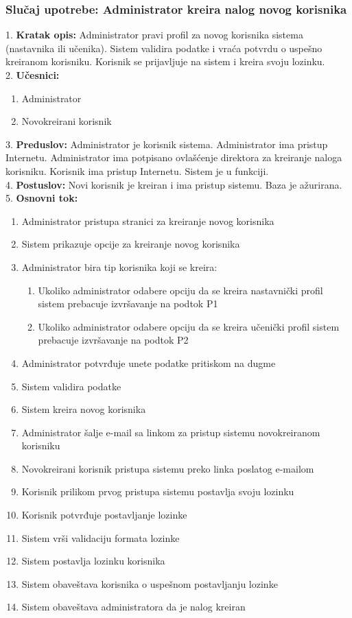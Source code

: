 \documentclass{article}
\begin{document}
\subsubsection{Slučaj upotrebe: Administrator kreira nalog novog korisnika} 
1. \textbf{Kratak opis:} Administrator pravi profil za novog korisnika sistema (nastavnika ili učenika). Sistem validira podatke i vraća potvrdu o uspešno kreiranom korisniku. Korisnik se prijavljuje na sistem i kreira svoju lozinku. \\

2. \textbf{Učesnici:}
\begin{enumerate} [label=(\alph*)]
\item Administrator
\item Novokreirani korisnik
\end{enumerate} 

3. \textbf{Preduslov:} Administrator je korisnik sistema. Administrator ima pristup Internetu. Administrator ima potpisano ovlašćenje direktora za kreiranje naloga korisniku. Korisnik ima pristup Internetu. Sistem je u funkciji. \\

4. \textbf{Postuslov:} Novi korisnik je kreiran i ima pristup sistemu. Baza je ažurirana. \\

5. \textbf{Osnovni tok:} 
\begin{enumerate} [label=(\alph*)]
\item Administrator pristupa stranici za kreiranje novog korisnika
\item Sistem prikazuje opcije za kreiranje novog korisnika
\item Administrator bira tip korisnika koji se kreira:
\begin{enumerate} [label=(\roman*)]
    \item Ukoliko administrator odabere opciju da se kreira nastavnički profil sistem prebacuje izvršavanje na podtok P1
    \item Ukoliko administrator odabere opciju da se kreira učenički profil sistem prebacuje izvršavanje na podtok P2
\end{enumerate}
\item Administrator potvrđuje unete podatke pritiskom na dugme
\item Sistem validira podatke
\item Sistem kreira novog korisnika
\item Administrator šalje e-mail sa linkom za pristup sistemu novokreiranom korisniku
\item Novokreirani korisnik pristupa sistemu preko linka poslatog e-mailom
\item Korisnik prilikom prvog pristupa sistemu postavlja svoju lozinku
\item Korisnik potvrđuje postavljanje lozinke
\item Sistem vrši validaciju formata lozinke
\item Sistem postavlja lozinku korisnika
\item Sistem obaveštava korisnika o uspešnom postavljanju lozinke
\item Sistem obaveštava administratora da je nalog kreiran
\end{enumerate}
\end{document}
